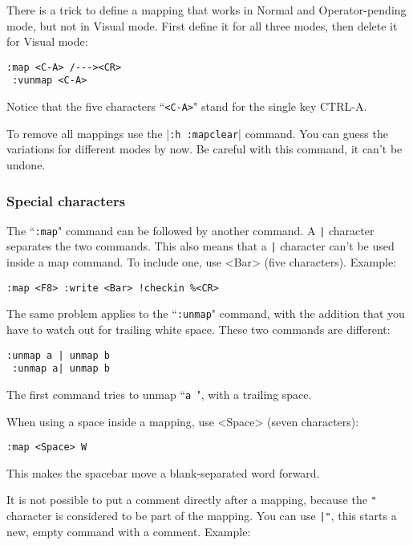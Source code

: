 There is a trick to define a mapping that works in Normal and Operator-pending mode, but not in Visual mode.
First define it for all three modes, then delete it for Visual mode:

\begin{Verbatim}[samepage=true]
 :map <C-A> /---><CR>
 :vunmap <C-A>
\end{Verbatim}

Notice that the five characters ``\texttt{<C-A>}" stand for the single key CTRL-A.

To remove all mappings use the |\texttt{:h :mapclear}| command.
You can guess the variations for different modes by now.
Be careful with this command, it can't be undone.

\subsubsection{Special characters}
The ``\texttt{:map}" command can be followed by another command.
A \texttt{|} character separates the two commands.
This also means that a \texttt{|} character can't be used inside a map command.
To include one, use <Bar> (five characters).
Example:

\begin{Verbatim}[samepage=true]
 :map <F8> :write <Bar> !checkin %<CR>
\end{Verbatim}

The same problem applies to the ``\texttt{:unmap}" command, with the addition that you have to watch out for trailing white space.
These two commands are different:

\begin{Verbatim}[samepage=true]
 :unmap a | unmap b
 :unmap a| unmap b
\end{Verbatim}

The first command tries to unmap ``\texttt{a }", with a trailing space.

When using a space inside a mapping, use <Space> (seven characters):

\begin{Verbatim}[samepage=true]
 :map <Space> W
\end{Verbatim}

This makes the spacebar move a blank-separated word forward.

It is not possible to put a comment directly after a mapping, because the \texttt{"} character is considered to be part of the mapping.
You can use \texttt{|"}, this starts a new, empty command with a comment.
Example:

